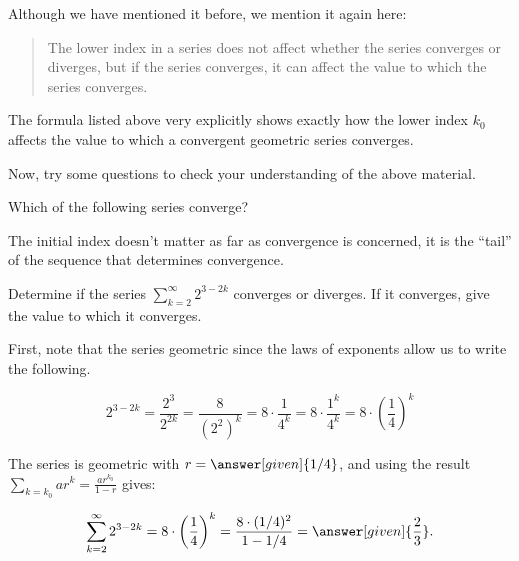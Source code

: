 \documentclass{ximera}
\begin{document}
\begin{remark} 
Although we have mentioned it before, we mention it again here:

\begin{quote}
The lower index in a series does not affect whether the series converges or diverges, but if the series converges, it can affect the value to which the series converges.
\end{quote}
The formula listed above very explicitly shows exactly how the lower index $k_0$ affects the value to which a convergent geometric series converges.

\end{remark}

Now, try some questions to check your understanding of the above material.

\begin{question}
  Which of the following series converge?
  \begin{selectAll}
  \end{selectAll}
  \begin{hint}
    The initial index doesn't matter as far as convergence is
    concerned, it is the ``tail'' of the sequence that determines
    convergence.
  \end{hint}
\end{question}

\begin{question}
Determine if the series $\sum_{k=2}^{\infty} 2^{3-2k}$ converges or diverges.  If it converges, give the value to which it converges.

\begin{explanation}
First, note that the series  geometric since the laws of exponents allow us to write the following.

\[
2^{3-2k} = \frac{2^3}{2^{2k}} = \frac{8}{\left(2^2\right)^k} =  8 \cdot \frac{1}{4^k} =  8 \cdot \frac{1^k}{4^k} =  8 \cdot \left(\frac{1}{4}\right)^k
\]

The series is geometric with $r = \answer[given]{1/4}$, and using the result $\sum_{k=k_0} ar^k = \frac{ar^{k_0}}{1-r}$ gives:

\[
\sum_{k=2}^{\infty} 2^{3-2k} =  8 \cdot \left(\frac{1}{4}\right)^k =  \frac{8 \cdot (1/4)^2}{1-1/4}  =  \answer[given]{\frac{2}{3}}.
\]
\end{explanation}

\end{question}    
\end{document}
